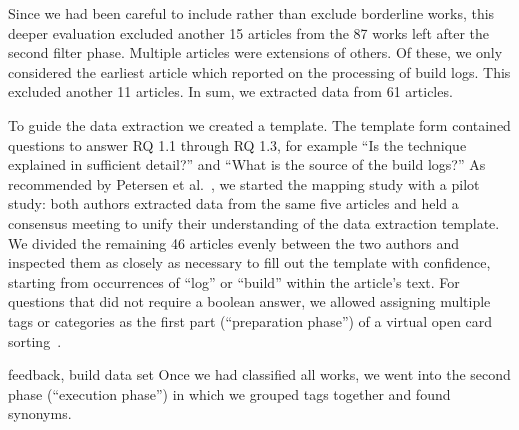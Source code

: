 Since we had been careful to include rather than exclude borderline
works, this deeper evaluation excluded another 15 articles from the 87
works left after the second filter phase.
Multiple articles were extensions of others.
Of these, we only considered the earliest article which reported on
the processing of build logs.
This excluded another 11 articles.
In sum, we extracted data from 61 articles.

To guide the data extraction we created a template.
The template form contained questions to answer RQ 1.1 through RQ 1.3,
for example ``Is the technique explained in sufficient detail?'' and
``What is the source of the build logs?'' As recommended by Petersen et
al.~\cite{petersen2015guidelines}, we started the mapping study with a
pilot study:
both authors extracted	data from the same five articles and held a
consensus meeting to unify their understanding
of the data extraction template.
We divided the remaining 46 articles evenly between the two authors
and inspected them as closely as necessary to fill out the template
with confidence,
starting from occurrences of ``log'' or ``build'' within the article's
text.
For questions that did not require a boolean answer, we allowed assigning
multiple tags or categories as the first part (``preparation phase'')
of a virtual open card sorting~\cite{zimmermann2016card}.

feedback, build data set
Once we had classified all works, we went into the second phase
(``execution phase'') in which we  grouped tags
together and found synonyms.





